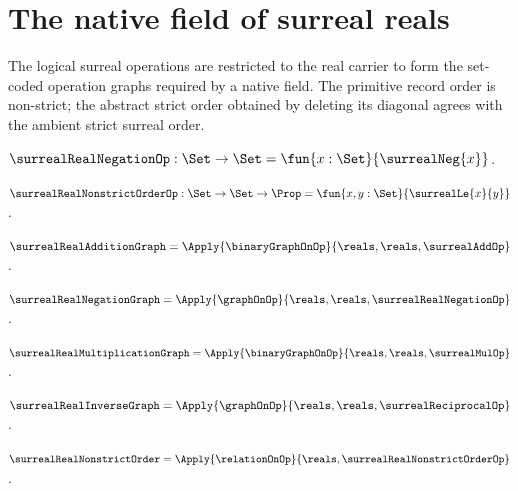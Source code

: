 \section{The native field of surreal reals}





The logical surreal operations are restricted to the real carrier to form
the set-coded operation graphs required by a native field.  The primitive
record order is non-strict; the abstract strict order obtained by deleting
its diagonal agrees with the ambient strict surreal order.

\begin{definition}\label{surreal_real_negation_op}
    $\surrealRealNegationOp:\Set\to\Set
        =\fun{x:\Set}{\surrealNeg{x}}$.
\end{definition}

\begin{definition}\label{surreal_real_nonstrict_order_op}
    $\surrealRealNonstrictOrderOp:\Set\to\Set\to\Prop
        =\fun{x,y:\Set}{\surrealLe{x}{y}}$.
\end{definition}

\begin{definition}\label{surreal_real_addition_graph}
    $\surrealRealAdditionGraph=
        \Apply{\binaryGraphOnOp}
            {\reals,\reals,\surrealAddOp}$.
\end{definition}

\begin{definition}\label{surreal_real_negation_graph}
    $\surrealRealNegationGraph=
        \Apply{\graphOnOp}
            {\reals,\reals,\surrealRealNegationOp}$.
\end{definition}

\begin{definition}\label{surreal_real_multiplication_graph}
    $\surrealRealMultiplicationGraph=
        \Apply{\binaryGraphOnOp}
            {\reals,\reals,\surrealMulOp}$.
\end{definition}

\begin{definition}\label{surreal_real_inverse_graph}
    $\surrealRealInverseGraph=
        \Apply{\graphOnOp}
            {\reals,\reals,\surrealReciprocalOp}$.
\end{definition}

\begin{definition}\label{surreal_real_nonstrict_order}
    $\surrealRealNonstrictOrder=
        \Apply{\relationOnOp}
            {\reals,\surrealRealNonstrictOrderOp}$.
\end{definition}


